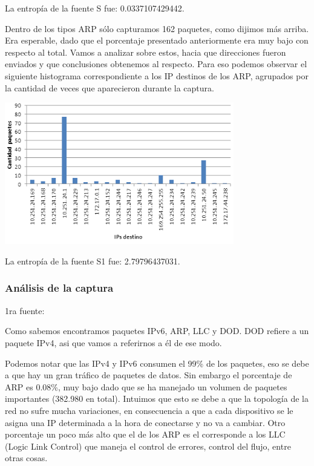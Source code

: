 La entrop\'ia de la fuente S fue: 0.0337107429442.\newline

Dentro de los tipos ARP s\'olo capturamos 162 paquetes, como dijimos m\'as arriba. Era esperable, dado que el porcentaje presentado anteriormente era muy bajo con respecto al total. \newline
Vamos a analizar sobre estos, hacia que direcciones fueron enviados y que conclusiones obtenemos al respecto. Para eso podemos observar el siguiente histograma correspondiente a los IP destinos de los ARP, agrupados por la cantidad de veces que aparecieron durante la captura.

\begin{center}
\includegraphics[width=0.75\textwidth]{exp1-graficos/grafico2exp1.png}
\end{center}

La entrop\'ia de la fuente S1 fue: 2.79796437031.


\subsubsection{An\'alisis de la captura}

1ra fuente:\newline

Como sabemos encontramos paquetes IPv6, ARP, LLC y DOD. DOD refiere a un paquete IPv4, asi que vamos a referirnos a \'el de ese modo.\newline

Podemos notar que las IPv4 y IPv6 consumen el 99\% de los paquetes, eso se debe a que hay un gran tr\'afico de paquetes de datos. Sin embargo el porcentaje de ARP es 0.08\%, muy bajo dado que se ha manejado un volumen de paquetes importantes (382.980 en total). Intuimos que esto se debe a que la topología de la red no sufre mucha variaciones, en consecuencia a que a cada dispositivo se le asigna una IP determinada a la hora de conectarse y no va a cambiar. Otro porcentaje un poco más alto que el de los ARP es el corresponde a los LLC (Logic Link Control) que maneja el control de errores, control del flujo, entre otras cosas.\newline


